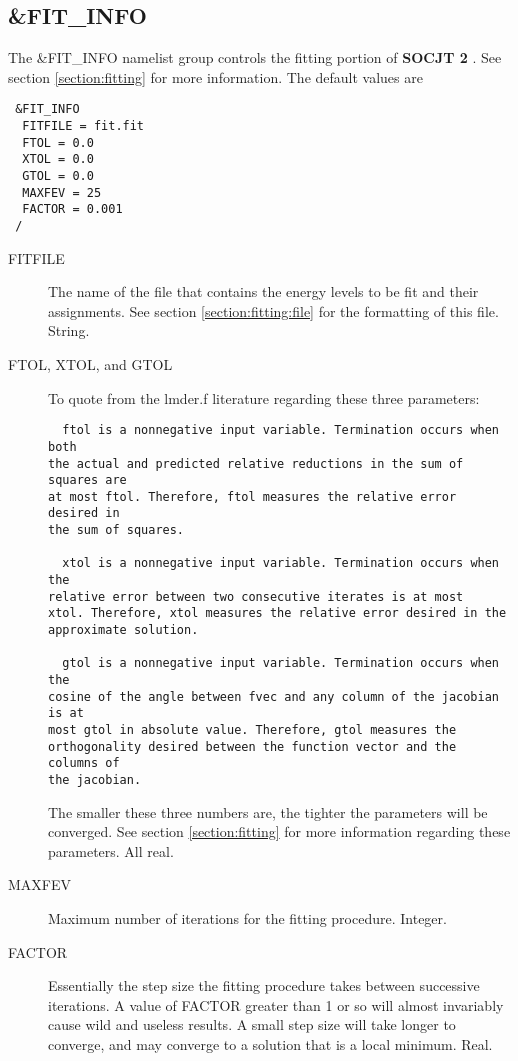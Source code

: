 \documentclass{article}
\newcommand{\socjttwo}{{\bf SOCJT 2}}
\begin{document}
\subsection{\&FIT\_INFO} \label{fitinfo}

The \&FIT\_INFO namelist group controls the fitting portion of \socjttwo
. See section \ref{section:fitting} for more information. The default values are

\begin{verbatim}
 &FIT_INFO
  FITFILE = fit.fit
  FTOL = 0.0
  XTOL = 0.0
  GTOL = 0.0
  MAXFEV = 25
  FACTOR = 0.001
 /
\end{verbatim}

\begin{description}

\item[FITFILE] The name of the file that contains the energy levels
  to be fit and their assignments.  See section \ref{section:fitting:file} for
  the formatting of this file. String.

\item[FTOL, XTOL, and GTOL] To quote from the lmder.f
  literature regarding these three parameters:
  \begin{verbatim}
  ftol is a nonnegative input variable. Termination occurs when both
the actual and predicted relative reductions in the sum of squares are
at most ftol. Therefore, ftol measures the relative error desired in
the sum of squares. 

  xtol is a nonnegative input variable. Termination occurs when the
relative error between two consecutive iterates is at most
xtol. Therefore, xtol measures the relative error desired in the
approximate solution. 

  gtol is a nonnegative input variable. Termination occurs when the
cosine of the angle between fvec and any column of the jacobian is at
most gtol in absolute value. Therefore, gtol measures the
orthogonality desired between the function vector and the columns of
the jacobian. 
 \end{verbatim}

 The smaller these three numbers are, the tighter the parameters will
 be converged. See section \ref{section:fitting} for more
 information regarding these parameters. All real.

\item[MAXFEV] Maximum number of iterations for the fitting
  procedure. Integer.

\item[FACTOR] Essentially the step size the fitting procedure takes
  between successive iterations. A value of FACTOR greater than 1 or
  so will almost invariably cause wild and useless results. A small
  step size will take longer to converge, and may converge to a
  solution that is a local minimum. Real.

\end{description}
\end{document}

